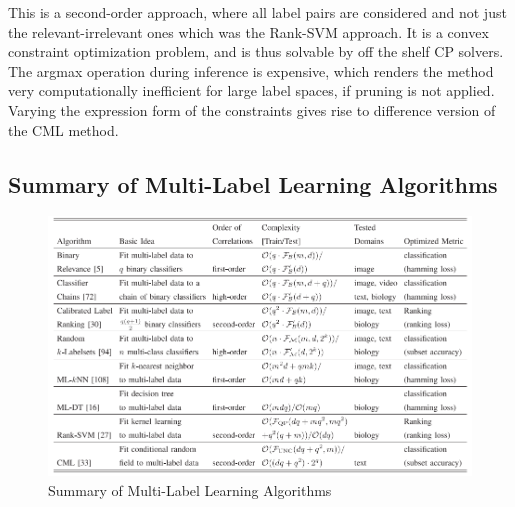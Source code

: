 \documentclass[12pt]{report}
\begin{document}
   This is a second-order approach, where all label pairs are considered and not
   just the relevant-irrelevant ones which was the Rank-SVM approach. It is a
   convex constraint optimization problem, and is thus solvable by off the shelf
   CP solvers. The argmax operation during inference is expensive, which renders
   the method very computationally inefficient for large label spaces, if
   pruning is not applied. Varying the expression form of the constraints gives rise to difference
   version of the CML method.
	 
	 \subsection*{Summary of Multi-Label Learning Algorithms}
	 
	 \begin{figure}[H]
	 	\centering
	 	\includegraphics[width=1\textwidth]{summary.png}
	 	\caption{Summary of Multi-Label Learning Algorithms}
	 	\centering
	 \end{figure}
 
\end{document}
